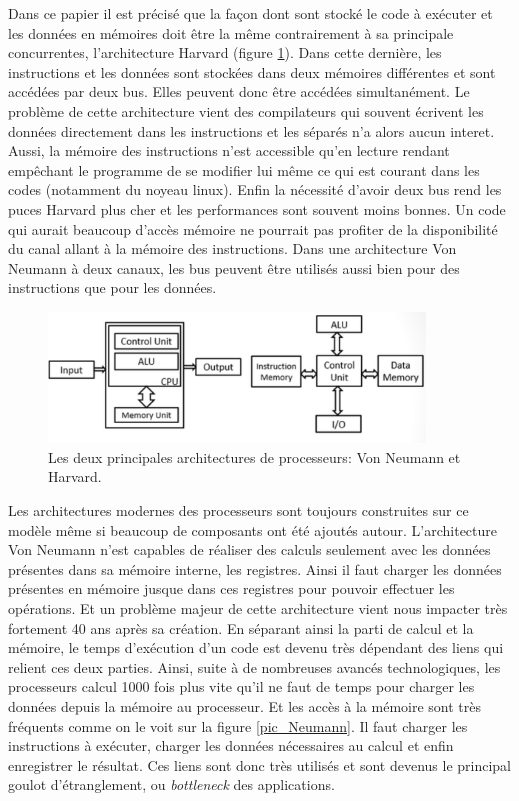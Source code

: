  
 Dans ce papier il est précisé que la façon dont sont stocké le code à exécuter et les données en mémoires doit être la même contrairement à sa principale concurrentes, l'architecture  Harvard (figure \ref{pic_neumannHarvard}). Dans cette dernière, les instructions et les données sont stockées dans deux mémoires différentes et sont accédées par deux bus. Elles peuvent donc être accédées simultanément. Le problème de cette architecture vient des compilateurs qui souvent écrivent les données directement dans les instructions et les séparés n'a alors aucun interet. Aussi, la mémoire des instructions n'est accessible qu'en lecture rendant empêchant le programme de se modifier lui même ce qui est courant dans les codes (notamment du noyeau linux). Enfin la nécessité d'avoir deux bus rend les puces Harvard plus cher et les performances sont souvent moins bonnes. Un code qui aurait beaucoup d'accès mémoire ne pourrait pas profiter de la disponibilité du canal allant à la mémoire des instructions. Dans une architecture Von Neumann à deux canaux, les bus peuvent être utilisés aussi bien pour des instructions que pour les données.
 

\begin{figure}
    \center
    \includegraphics[width=10cm]{images/Chapitre1/neumannHarvard.png}
    \caption{\label{pic_neumannHarvard} Les deux principales architectures de processeurs: Von Neumann et Harvard. }
\end{figure}

Les architectures modernes des processeurs sont toujours construites sur ce modèle même si beaucoup de composants ont été ajoutés autour. L'architecture Von Neumann n'est capables de réaliser des calculs seulement avec les données présentes dans sa mémoire interne, les registres. Ainsi il faut charger les données présentes en mémoire jusque dans ces registres pour pouvoir effectuer les opérations. Et un problème majeur de cette architecture vient nous impacter très fortement 40 ans après sa création. En séparant ainsi la parti de calcul et la mémoire, le temps d'exécution d'un code est devenu très dépendant des liens qui relient ces deux parties. Ainsi, suite à de nombreuses avancés technologiques, les processeurs calcul 1000 fois plus vite qu'il ne faut de temps pour charger les données depuis la mémoire au processeur. Et les accès à la mémoire sont très fréquents comme on le voit sur la figure \ref{pic_Neumann}. Il faut charger les instructions à exécuter, charger les données nécessaires au calcul et enfin enregistrer le résultat. Ces liens sont donc très utilisés et sont devenus le  principal goulot d'étranglement, ou \textit{bottleneck} des applications. 



